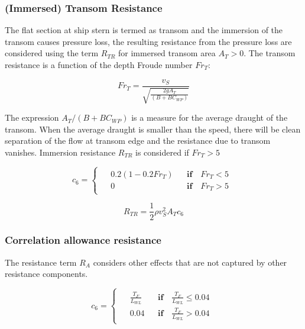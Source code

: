 \subsubsection*{(Immersed) Transom Resistance}

The flat section at ship stern is termed as transom and the immersion of the transom causes pressure loss, the resulting resistance from the pressure loss are considered using the term $R_{TR}$ for immersed transom area $A_T > 0$. The transom resistance is a function of the depth Froude number $Fr_{T}$:

\begin{equation}
    \label{eqn:Fr_t}
    Fr_T = \frac{v_S}{\sqrt{\frac{2gA_T}{(B+BC_{WP})}}}
\end{equation}

The expression $A_T/(B+BC_{WP})$ is a measure for the average draught of the transom. When the average draught is smaller than the speed, there will be clean separation of the flow at transom edge and the resistance due to transom vanishes. Immersion resistance $R_{TR}$ is considered if $Fr_{T} > 5$ 

\begin{equation}
    \label{eqn:c6}
        c_6 = 
        \begin{cases}
            \begin{aligned}
              &0.2(1-0.2Fr_T) && \textbf{if} \quad Fr_T < 5 \\
              & 0 && \textbf{if} \quad Fr_T > 5  
            \end{aligned}
        \end{cases}
\end{equation}

\begin{equation}
    \label{R_transom}
    R_{TR} = \frac{1}{2}\rho v_S^2 A_T c_6
\end{equation}

\subsubsection*{Correlation allowance resistance}

The resistance term $R_A$ considers other effects that are not captured by other resistance components. 

\begin{equation}
    \label{eqn:c4}
    c_6 =
    \begin{cases}
        \begin{aligned}
            &\frac{T_F}{L_{WL}} && \textbf{if} \quad \frac{T_F}{L_{WL}} \leqslant 0.04 \\
            &0.04 && \textbf{if} \quad \frac{T_F}{L_{WL}} >0.04 
        \end{aligned}
    \end{cases}
\end{equation}

